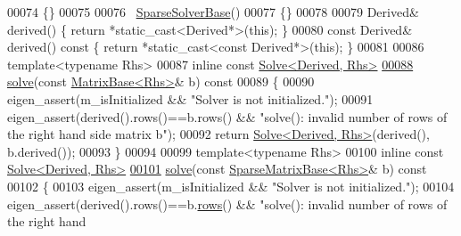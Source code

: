 \begin{DoxyCode}
00074     \{\}
00075 
00076     ~\hyperlink{group___sparse_core___module_class_eigen_1_1_sparse_solver_base}{SparseSolverBase}()
00077     \{\}
00078 
00079     Derived& derived() \{ \textcolor{keywordflow}{return} *\textcolor{keyword}{static\_cast<}Derived*\textcolor{keyword}{>}(\textcolor{keyword}{this}); \}
00080     \textcolor{keyword}{const} Derived& derived()\textcolor{keyword}{ const }\{ \textcolor{keywordflow}{return} *\textcolor{keyword}{static\_cast<}\textcolor{keyword}{const }Derived*\textcolor{keyword}{>}(\textcolor{keyword}{this}); \}
00081     
00086     \textcolor{keyword}{template}<\textcolor{keyword}{typename} Rhs>
00087     \textcolor{keyword}{inline} \textcolor{keyword}{const} \hyperlink{group___core___module_class_eigen_1_1_solve}{Solve<Derived, Rhs>}
\hyperlink{group___sparse_core___module_a4a66e9498b06e3ec4ec36f06b26d4e8f}{00088}     \hyperlink{group___sparse_core___module_a4a66e9498b06e3ec4ec36f06b26d4e8f}{solve}(\textcolor{keyword}{const} \hyperlink{group___core___module_class_eigen_1_1_matrix_base}{MatrixBase<Rhs>}& b)\textcolor{keyword}{ const}
00089 \textcolor{keyword}{    }\{
00090       eigen\_assert(m\_isInitialized && \textcolor{stringliteral}{"Solver is not initialized."});
00091       eigen\_assert(derived().rows()==b.rows() && \textcolor{stringliteral}{"solve(): invalid number of rows of the right hand side
       matrix b"});
00092       \textcolor{keywordflow}{return} \hyperlink{group___core___module_class_eigen_1_1_solve}{Solve<Derived, Rhs>}(derived(), b.derived());
00093     \}
00094     
00099     \textcolor{keyword}{template}<\textcolor{keyword}{typename} Rhs>
00100     \textcolor{keyword}{inline} \textcolor{keyword}{const} \hyperlink{group___core___module_class_eigen_1_1_solve}{Solve<Derived, Rhs>}
\hyperlink{group___sparse_core___module_a3a8d97173b6e2630f484589b3471cfc7}{00101}     \hyperlink{group___sparse_core___module_a3a8d97173b6e2630f484589b3471cfc7}{solve}(\textcolor{keyword}{const} \hyperlink{group___sparse_core___module_class_eigen_1_1_sparse_matrix_base}{SparseMatrixBase<Rhs>}& b)\textcolor{keyword}{ const}
00102 \textcolor{keyword}{    }\{
00103       eigen\_assert(m\_isInitialized && \textcolor{stringliteral}{"Solver is not initialized."});
00104       eigen\_assert(derived().rows()==b.\hyperlink{group___sparse_core___module_a1944e9fa9ce7937bfc3a87b2cb94371f}{rows}() && \textcolor{stringliteral}{"solve(): invalid number of rows of the right hand
}
\end{DoxyCode}

